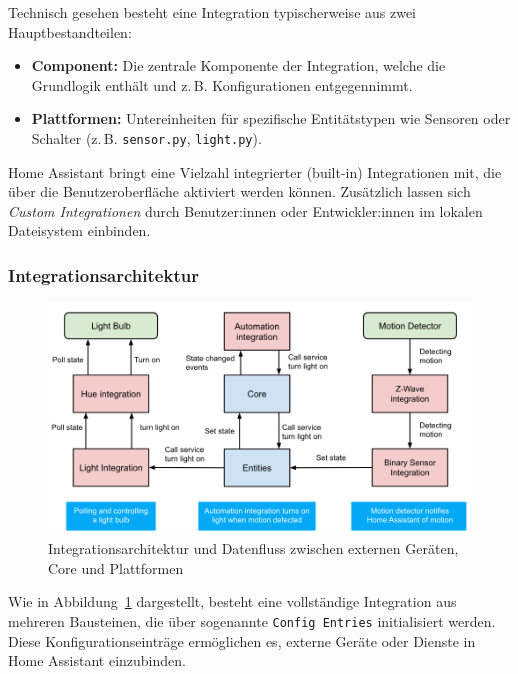 Technisch gesehen besteht eine Integration typischerweise aus zwei Hauptbestandteilen:

\begin{itemize}
    \item \textbf{Component:} Die zentrale Komponente der Integration, welche die Grundlogik enthält und z.\,B. Konfigurationen entgegennimmt.\\
    \item \textbf{Plattformen:} Untereinheiten für spezifische Entitätstypen wie Sensoren oder Schalter (z.\,B. \texttt{sensor.py}, \texttt{light.py}).\\
\end{itemize}

Home Assistant bringt eine Vielzahl integrierter (built-in) Integrationen mit, die über die Benutzeroberfläche aktiviert werden können. Zusätzlich lassen sich \textit{Custom Integrationen} durch Benutzer:innen oder Entwickler:innen im lokalen Dateisystem einbinden.

\subsubsection{Integrationsarchitektur}

\begin{figure}[H]
    \centering
    \includegraphics[width=\linewidth]{images/HA_integration_architechture.png}
    \caption{Integrationsarchitektur und Datenfluss zwischen externen Geräten, Core und Plattformen}
    \label{fig:integration-architecture}
\end{figure}

Wie in Abbildung~\ref{fig:integration-architecture} dargestellt, besteht eine vollständige Integration aus mehreren Bausteinen, die über sogenannte \texttt{Config Entries} initialisiert werden. Diese Konfigurationseinträge ermöglichen es, externe Geräte oder Dienste in Home Assistant einzubinden. 

